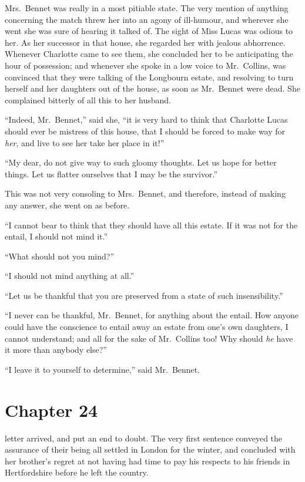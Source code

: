 Mrs.\ Bennet was really in a most pitiable state.  The very
mention of anything concerning the match threw her into an
agony of ill-humour, and wherever she went she was sure of
hearing it talked of.  The sight of Miss Lucas was odious to
her.  As her successor in that house, she regarded her with
jealous abhorrence.  Whenever Charlotte came to see them,
she concluded her to be anticipating the hour of possession;
and whenever she spoke in a low voice to Mr.\ Collins, was
convinced that they were talking of the Longbourn estate, and
resolving to turn herself and her daughters out of the house,
as soon as Mr.\ Bennet were dead.  She complained bitterly of
all this to her husband.

``Indeed, Mr.\ Bennet,'' said she, ``it is very hard to think that
Charlotte Lucas should ever be mistress of this house, that I
should be forced to make way for \emph{her}, and live to see her take
her place in it!''

``My dear, do not give way to such gloomy thoughts.  Let us
hope for better things.  Let us flatter ourselves that I may be
the survivor.''

This was not very consoling to Mrs.\ Bennet, and therefore, instead
of making any answer, she went on as before.

``I cannot bear to think that they should have all this estate.
If it was not for the entail, I should not mind it.''

``What should not you mind?''

``I should not mind anything at all.''

``Let us be thankful that you are preserved from a state of such
insensibility.''

``I never can be thankful, Mr.\ Bennet, for anything about the
entail.  How anyone could have the conscience to entail away an
estate from one's own daughters, I cannot understand; and all
for the sake of Mr.\ Collins too!  Why should \emph{he} have it more
than anybody else?''

``I leave it to yourself to determine,'' said Mr.\ Bennet.



\chapter{Chapter 24}


 letter arrived, and put an end to doubt.  The very
first sentence conveyed the assurance of their being all settled
in London for the winter, and concluded with her brother's regret
at not having had time to pay his respects to his friends in
Hertfordshire before he left the country.

